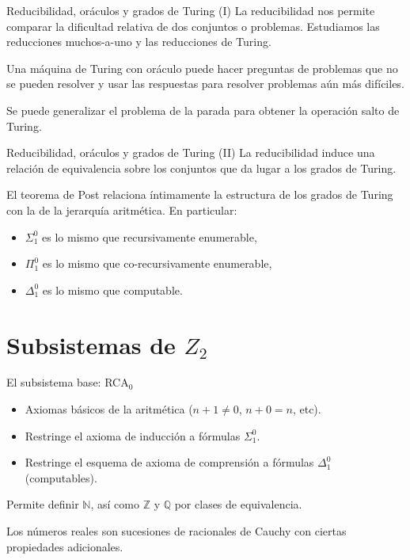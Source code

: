 \documentclass[10pt]{beamer}
\begin{document}
\begin{frame}[fragile]{Reducibilidad, oráculos y grados de Turing (I)}
  La \alert{reducibilidad} nos permite comparar la dificultad relativa de dos conjuntos o problemas. Estudiamos las reducciones muchos-a-uno y las reducciones de Turing.

  Una máquina de Turing con \alert{oráculo} puede hacer preguntas de problemas que no se pueden resolver y usar las respuestas para resolver problemas aún más difíciles.

  Se puede generalizar el problema de la parada para obtener la operación \alert{salto de Turing}.
\end{frame}

\begin{frame}[fragile]{Reducibilidad, oráculos y grados de Turing (II)}
  La reducibilidad induce una relación de equivalencia sobre los conjuntos que da lugar a los \alert{grados de Turing}.

  El teorema de Post relaciona íntimamente la estructura de los grados de Turing con la de la jerarquía aritmética. En particular:

  \begin{itemize}
  \item $\Sigma_1^0$ es lo mismo que recursivamente enumerable,
  \item $\Pi_1^0$ es lo mismo que co-recursivamente enumerable,
  \item $\Delta_1^0$ es lo mismo que computable.
  \end{itemize}
\end{frame}

\section{Subsistemas de $Z_2$}

\begin{frame}[fragile]{El subsistema base: RCA$_0$}
  \begin{itemize}
  \item Axiomas básicos de la aritmética ($n + 1 \ne 0$, $n + 0 = n$, etc).
  \item Restringe el axioma de inducción a fórmulas $\Sigma_1^0$.
  \item Restringe el esquema de axioma de comprensión a fórmulas $\Delta_1^0$ (computables).
  \end{itemize}

  Permite definir $\mathbb{N}$, así como $\mathbb{Z}$ y $\mathbb{Q}$ por clases de equivalencia.

  Los números reales son sucesiones de racionales de Cauchy con ciertas propiedades adicionales.
\end{frame}
\end{document}
